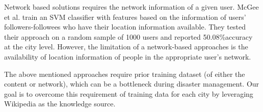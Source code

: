 Network based solutions requires the network information of a given user. McGee et al. \cite{mcgee2013location} train an SVM classifier with features based on the information of users' followers-followees who have their location information available. They tested their approach on a random sample of 1000 users and reported 50.08\%accuracy at the city level. However, the limitation of a network-based approaches is the availability of location information of people in the appropriate user's network.   

The above mentioned approaches require prior training dataset (of either the content or network), which can be a bottleneck during disaster management. Our goal is to overcome this requirement of training data for each city by leveraging Wikipedia as the knowledge source.
